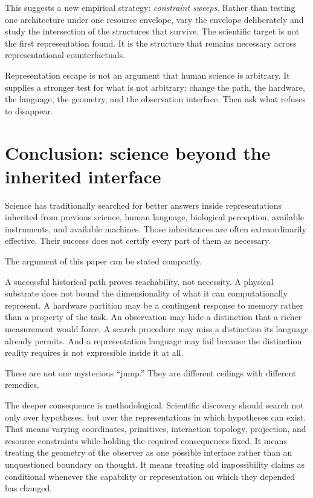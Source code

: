 \documentclass[11pt]{article}
\begin{document}
This suggests a new empirical strategy: \emph{constraint sweeps}. Rather than testing one architecture under one resource envelope, vary the envelope deliberately and study the intersection of the structures that survive. The scientific target is not the first representation found. It is the structure that remains necessary across representational counterfactuals.

\begin{resultbox}
Representation escape is not an argument that human science is arbitrary. It supplies a stronger test for what is not arbitrary: change the path, the hardware, the language, the geometry, and the observation interface. Then ask what refuses to disappear.
\end{resultbox}

\section{Conclusion: science beyond the inherited interface}
Science has traditionally searched for better answers inside representations inherited from previous science, human language, biological perception, available instruments, and available machines. Those inheritances are often extraordinarily effective. Their success does not certify every part of them as necessary.

The argument of this paper can be stated compactly.

A successful historical path proves reachability, not necessity. A physical substrate does not bound the dimensionality of what it can computationally represent. A hardware partition may be a contingent response to memory rather than a property of the task. An observation may hide a distinction that a richer measurement would force. A search procedure may miss a distinction its language already permits. And a representation language may fail because the distinction reality requires is not expressible inside it at all.

These are not one mysterious ``jump.'' They are different ceilings with different remedies.

The deeper consequence is methodological. Scientific discovery should search not only over hypotheses, but over the representations in which hypotheses can exist. That means varying coordinates, primitives, interaction topology, projection, and resource constraints while holding the required consequences fixed. It means treating the geometry of the observer as one possible interface rather than an unquestioned boundary on thought. It means treating old impossibility claims as conditional whenever the capability or representation on which they depended has changed.
\end{document}
